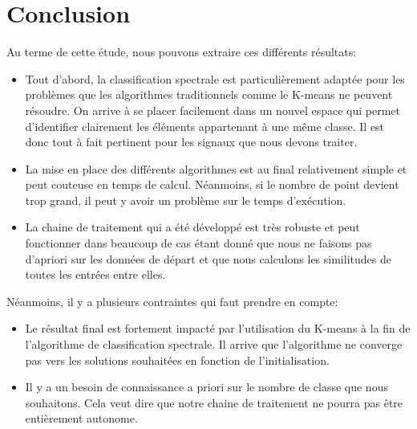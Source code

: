 \chapter*{Conclusion}

Au terme de cette étude, nous pouvons extraire ces différents résultats:

\begin{itemize}
\item Tout d'abord, la classification spectrale est particulièrement adaptée pour les problèmes que les algorithmes traditionnels comme le K-means ne peuvent résoudre. On arrive à se placer facilement dans un nouvel espace qui permet d'identifier clairement les éléments appartenant à une même classe. Il est donc tout à fait pertinent pour les signaux que nous devons traiter.
\item La mise en place des différents algorithmes est au final relativement simple et peut couteuse en temps de calcul. Néanmoins, si le nombre de point devient trop grand, il peut y avoir un problème sur le temps d'exécution.
\item La chaine de traitement qui a été développé est très robuste et peut fonctionner dans beaucoup de cas étant donné que nous ne faisons pas d'apriori sur les données de départ et que nous calculons les similitudes de toutes les entrées entre elles.
\end{itemize}

\medskip

Néanmoins, il y a plusieurs contraintes qui faut prendre en compte:

\begin{itemize}
\item Le résultat final est fortement impacté par l'utilisation du K-means à la fin de l'algorithme de classification spectrale. Il arrive que l'algorithme ne converge pas vers les solutions souhaitées en fonction de l'initialisation.
\item Il y a un besoin de connaissance a priori sur le nombre de classe que nous souhaitons. Cela veut dire que notre chaine de traitement ne pourra pas être entièrement autonome.
\end{itemize}